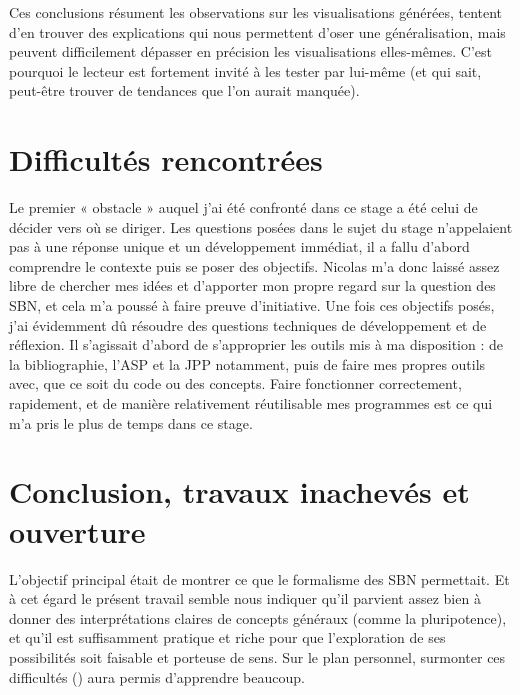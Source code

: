 \documentclass[12pt, a4paper]{article}
\begin{document}
Ces conclusions résument les observations sur les visualisations générées, tentent d'en trouver des explications qui nous permettent d'oser une généralisation, mais peuvent difficilement dépasser en précision les visualisations elles-mêmes. C'est pourquoi le lecteur est fortement invité à les tester par lui-même (et qui sait, peut-être trouver de tendances que l'on aurait manquée).

\section{Difficultés rencontrées}
\label{sec:difficultes}

Le premier « obstacle » auquel j'ai été confronté dans ce stage a été celui de décider vers où se diriger. Les questions posées dans le sujet du stage n'appelaient pas à une réponse unique et un développement immédiat, il a fallu d'abord comprendre le contexte puis se poser des objectifs. Nicolas m'a donc laissé assez libre de chercher mes idées et d'apporter mon propre regard sur la question des SBN, et cela m'a poussé à faire preuve d'initiative. Une fois ces objectifs posés, j'ai évidemment dû résoudre des questions techniques de développement et de réflexion. Il s'agissait d'abord de s'approprier les outils mis à ma disposition : de la bibliographie, l'ASP et la JPP notamment, puis de faire mes propres outils avec, que ce soit du code ou des concepts. Faire fonctionner correctement, rapidement, et de manière relativement réutilisable mes programmes est ce qui m'a pris le plus de temps dans ce stage.

\section{Conclusion, travaux inachevés et ouverture}

L'objectif principal était de montrer ce que le formalisme des SBN permettait. Et à cet égard le présent travail semble nous indiquer qu'il parvient assez bien à donner des interprétations claires de concepts généraux (comme la pluripotence), et qu'il est suffisamment pratique et riche pour que l'exploration de ses possibilités soit faisable et porteuse de sens.
Sur le plan personnel, surmonter ces difficultés () aura permis d'apprendre beaucoup.
\end{document}
